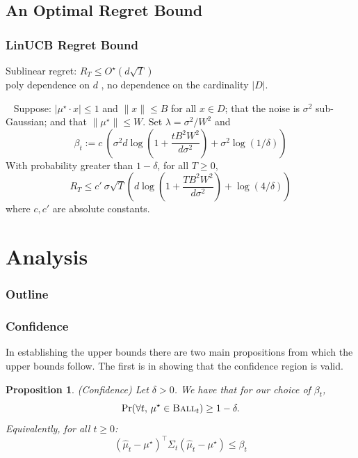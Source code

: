 \documentclass[aspectratio=169]{beamer}
\newtheorem{proposition}[theorem]{Proposition}
\begin{document}
\subsection{An Optimal Regret Bound}

\begin{frame}\frametitle{LinUCB Regret Bound}

Sublinear regret: $R_T \leq O^\star(d \sqrt{T})$ \\
\alert{poly dependence on $d$} , no dependence on the cardinality $|D|$.

\begin{theorem}~\label{theorem:sqrtregret}
Suppose: $|\mu^\star\cdot x| \leq 1$ and $\|x\|\leq B$ for all $x\in
D$; that the noise is $\sigma^2$ sub-Gaussian; and that
$\|\mu^\star\|\leq W$. Set
$\lambda =\sigma^2/W^2$ and
\[
\beta_t := c \ \left( \sigma^2 d \log\left( 1 + \frac{tB^2W^2}{d\sigma^2} \right) + \sigma^2 \log(1/\delta) \right)
\]
With probability greater than $1-\delta$, for all $T\geq 0$, 
\[
R_T \leq c' \ \sigma \sqrt{T} \left( d\log\left( 1 + \frac{TB^2W^2}{ d\sigma^2} \right)
+   \log(4/ \delta) \right)
\]
where $c,c'$ are absolute constants. 
\end{theorem}


\end{frame}



\section{Analysis}

 \begin{frame}[noframenumbering]
    \frametitle{Outline}
    \tableofcontents[currentsection]
  \end{frame}


\begin{frame}\frametitle{Confidence}

In establishing the upper bounds there are two main propositions from
which the upper bounds follow. The first is in showing that the
confidence region is valid. 

\begin{proposition} \label{proposition:confidence} 
(Confidence) Let $\delta>0$.  We have that for our choice of $\beta_t$,
\[
\Pr(\forall t, \, \mu^\star \in \textsc{Ball}_t ) \ge 1 - \delta.
\]
Equivalently, for all $t \ge 0$:
\[
(\widehat{\mu}_t - \mu^\star)^\top \Sigma_t (\widehat{\mu}_t - \mu^\star) \le \beta_t
\]
\end{proposition}



\end{frame}
\end{document}
